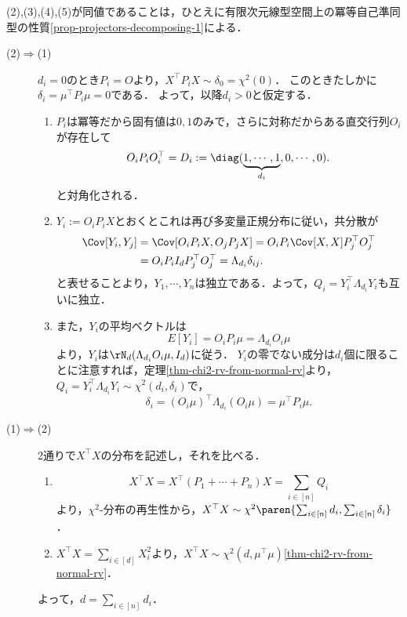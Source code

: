\documentclass[uplatex,dvipdfmx]{jsarticle}
\begin{document}
\begin{Proof}
    (2),(3),(4),(5)が同値であることは，ひとえに有限次元線型空間上の冪等自己準同型の性質\ref{prop-projectors-decomposing-1}による．
    \begin{description}
        \item[(2)$\Rightarrow$(1)] 
        $d_i=0$のとき$P_i=O$より，$X^\top P_iX\sim\delta_0=\chi^2(0)$．
        このときたしかに$\delta_i=\mu^\top P_i\mu=0$である．
        よって，以降$d_i>0$と仮定する．
        \begin{enumerate}[{Step}1]
            \item $P_i$は冪等だから固有値は$0,1$のみで，さらに対称だからある直交行列$O_i$が存在して
            \[O_iP_iO_i^\top=D_i:=\diag(\underbrace{1,\cdots,1}_{d_i},0,\cdots,0).\]
            と対角化される．
            \item $Y_i:=O_iP_iX$とおくとこれは再び多変量正規分布に従い，共分散が
            \begin{align*}
                \Cov[Y_i,Y_j]&=\Cov[O_iP_iX,O_jP_jX]=O_iP_i\Cov[X,X]P_j^\top O_j^\top\\
                &=O_iP_iI_dP_j^\top O_j^\top=\Lambda_{d_i}\delta_{ij}.
            \end{align*}
            と表せることより，$Y_1,\cdots,Y_n$は独立である．よって，$Q_i=Y_i^\top\Lambda_{d_i}Y_i$も互いに独立．
            \item また，$Y_i$の平均ベクトルは
            \[E[Y_i]=O_iP_i\mu=\Lambda_{d_i}O_i\mu\]
            より，$Y_i$は$\rN_d(\Lambda_{d_i}O_i\mu,I_d)$に従う．
            $Y_i$の零でない成分は$d_i$個に限ることに注意すれば，定理\ref{thm-chi2-rv-from-normal-rv}より，$Q_i=Y_i^\top\Lambda_{d_i}Y_i\sim\chi^2(d_i,\delta_i)$で，
            \[\delta_i=(O_i\mu)^\top \Lambda_{d_i}(O_i\mu)=\mu^\top P_i\mu.\]
        \end{enumerate}
        \item[(1)$\Rightarrow$(2)] 2通りで$X^\top X$の分布を記述し，それを比べる．
        \begin{enumerate}[1{通り目}]
            \item \[X^\top X=X^\top(P_1+\cdots+P_n)X=\sum_{i\in[n]}Q_i\]
            より，$\chi^2$-分布の再生性から，$X^\top X\sim\chi^2\paren{\sum_{i\in[n]}d_i,\sum_{i\in[n]}\delta_i}$．
            \item $X^\top X=\sum_{i\in[d]}X_i^2$より，$X^\top X\sim\chi^2(d,\mu^\top\mu)$\ref{thm-chi2-rv-from-normal-rv}．
        \end{enumerate}
        よって，$d=\sum_{i\in[n]}d_i$．
    \end{description}
\end{Proof}
\end{document}
